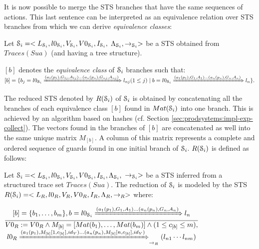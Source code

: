 It is now possible to merge the STS branches that have the same
sequences of actions. This last sentence can be interpreted as an
equivalence relation over STS branches from which we can derive
\emph{equivalence classes}:

\begin{definition}
Let
$\EuScript{S}_i=<L_{\EuScript{S}_i},l0_{\EuScript{S}_i},V_{\EuScript{S}_i},V0_{\EuScript{S}_i},I_{\EuScript{S}_i},$
$\Lambda_{\EuScript{S}_i}, \rightarrow_{\EuScript{S}_i}>$ be a STS obtained from
$Traces(Sua)$ (and having a tree structure).

$[b]$ denotes the \emph{equivalence class} of $\EuScript{S}_i$
branches such that: $[b]=\{
    b_j = l0_{\EuScript{S}_i}\\ \xRightarrow{(a_1(p_1),G_{1j},A_{1j}) \dots
    (a_n(p_n),G_{nj},A_{nj})}
    l_{nj} (1 \leq j) \mid b = l0_{\EuScript{S}_i}
    \xRightarrow{(a_1(p_1),G_{1},A_{1})\dots(a_n(p_n),G_{n},A_{n})} l_n\}.$
\end{definition}

The reduced STS denoted by $R(\EuScript{S}_i)$ of
$\EuScript{S}_i$ is obtained by concatenating all the branches of
each equivalence class $[b]$ found in $Mat(\EuScript{S}_i)$ into
one branch. This is achieved by an algorithm based on hashes (cf.
Section \ref{sec:prodsystems:impl-exp-collect}). The vectors
found in the branches of $[b]$ are concatenated as well into the
same unique matrix $M_{[b]}$. A column of this matrix represents
a complete and ordered sequence of guards found in one initial
branch of $\EuScript{S}_i$. $R(\EuScript{S}_i)$ is defined as
follows:

\begin{definition}
	\label{rule:min}

	Let $\EuScript{S}_i=<L_{\EuScript{S}_i},l0_{\EuScript{S}_i},V_{\EuScript{S}_i},V0_{\EuScript{S}_i},I_{\EuScript{S}_i},\Lambda_{\EuScript{S}_i},$ $\rightarrow_{\EuScript{S}_i}>$ be
    a STS inferred from a structured trace set $Traces(Sua)$. The
    reduction of $\EuScript{S}_i$ is modeled by the STS
    $R(\EuScript{S}_i)=
    <L_R,l0_R,V_R,V0_R,I_R,\Lambda_R,\rightarrow_R>$ where:

  \begin{center}
      {\Large
  $\frac{\begin{matrix}
      [b]=\{b_1, \dots ,b_m\},
      b=l0_{\EuScript{S}_i} \xRightarrow{(a_1(p_1),G_{1},A_{1})
      \dots (a_n(p_n),G_{n},A_{n})} l_{n}\\
    \end{matrix}
  }
  {\begin{matrix}
      V0_R:=V0_R \wedge M_{[b]}=[Mat(b_1), \dots ,Mat(b_m)] \wedge (1 \leq c_{[b]} \leq m),\\
      l0_R \xRightarrow{(a_1(p_1),M_{[b]}[1,c_{[b]}],id_V) \dots
      (a_n(p_n),M_{[b]}[n,c_{[b]}],id_V)}_{\rightarrow_R} (l_{n1}
      \cdots l_{nm})
    \end{matrix}
  }$
  }
  \end{center}
\end{definition}

